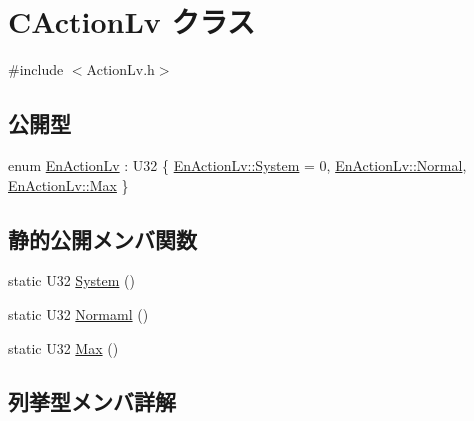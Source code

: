 \hypertarget{class_c_action_lv}{}\section{C\+Action\+Lv クラス}
\label{class_c_action_lv}


{\ttfamily \#include $<$Action\+Lv.\+h$>$}

\subsection*{公開型}
\begin{DoxyCompactItemize}
\item 
enum \hyperlink{class_c_action_lv_a1749377d2117848013fb5373d9d11750}{En\+Action\+Lv} \+: U32 \{ \hyperlink{class_c_action_lv_a1749377d2117848013fb5373d9d11750aa45da96d0bf6575970f2d27af22be28a}{En\+Action\+Lv\+::\+System} = 0, 
\hyperlink{class_c_action_lv_a1749377d2117848013fb5373d9d11750a960b44c579bc2f6818d2daaf9e4c16f0}{En\+Action\+Lv\+::\+Normal}, 
\hyperlink{class_c_action_lv_a1749377d2117848013fb5373d9d11750a6a061313d22e51e0f25b7cd4dc065233}{En\+Action\+Lv\+::\+Max}
 \}
\end{DoxyCompactItemize}
\subsection*{静的公開メンバ関数}
\begin{DoxyCompactItemize}
\item 
static U32 \hyperlink{class_c_action_lv_a0d923aa2f7e279e4210c739382fe09eb}{System} ()
\item 
static U32 \hyperlink{class_c_action_lv_a1c31162c00a28a339327154a594736bb}{Normaml} ()
\item 
static U32 \hyperlink{class_c_action_lv_ac4d8fa4b57fd7c12533b64ffc8891115}{Max} ()
\end{DoxyCompactItemize}


\subsection{列挙型メンバ詳解}
\hypertarget{class_c_action_lv_a1749377d2117848013fb5373d9d11750}{}
